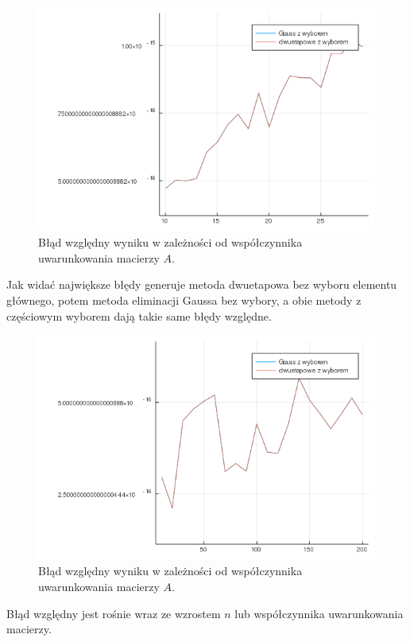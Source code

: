 \documentclass{article}
\begin{document}
\begin{figure}[H]
	\includegraphics[width=\linewidth]{precision_cond_3.png}
	\caption{Błąd względny wyniku w zależności od współczynnika uwarunkowania macierzy $A$.}
	\label{fig:asdf}
\end{figure}
Jak widać największe błędy generuje metoda dwuetapowa bez wyboru elementu głównego, potem metoda eliminacji Gaussa bez wybory, a obie metody z częściowym wyborem dają takie same błędy względne.\\
\begin{figure}[H]
	\includegraphics[width=\linewidth]{precision_n_3.png}
	\caption{Błąd względny wyniku w zależności od współczynnika uwarunkowania macierzy $A$.}
	\label{fig:asdf}
\end{figure}
Błąd względny jest rośnie wraz ze wzrostem $n$ lub współczynnika uwarunkowania macierzy.
\end{document}
